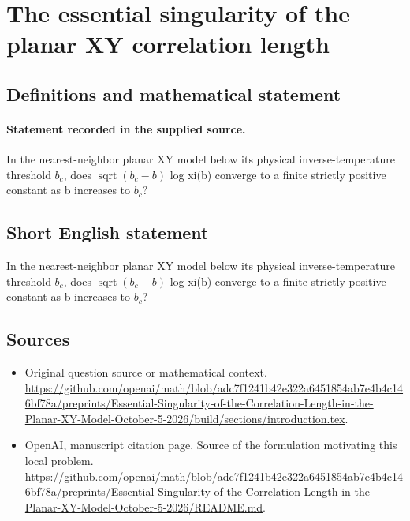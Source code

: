 \documentclass[11pt]{article}
\begin{document}
\section*{The essential singularity of the planar XY correlation length}\label{30007415}
\subsection{Definitions and mathematical statement}
\paragraph{Statement recorded in the supplied source.}
In the nearest-neighbor planar XY model below its physical inverse-temperature threshold $b_c$, does $\operatorname{sqrt}(b_c-b)$ log xi(b) converge to a finite strictly positive constant as b increases to $b_c$?
\subsection{Short English statement}
In the nearest-neighbor planar XY model below its physical inverse-temperature threshold $b_c$, does $\operatorname{sqrt}(b_c-b)$ log xi(b) converge to a finite strictly positive constant as b increases to $b_c$?
\subsection{Sources}
\begin{itemize}
\item[S1] Original question source or mathematical context.
\url{https://github.com/openai/math/blob/adc7f1241b42e322a6451854ab7e4b4c146bf78a/preprints/Essential-Singularity-of-the-Correlation-Length-in-the-Planar-XY-Model-October-5-2026/build/sections/introduction.tex}.
\item[S2] OpenAI, manuscript citation page. Source of the formulation motivating this local problem.
\url{https://github.com/openai/math/blob/adc7f1241b42e322a6451854ab7e4b4c146bf78a/preprints/Essential-Singularity-of-the-Correlation-Length-in-the-Planar-XY-Model-October-5-2026/README.md}.
\end{itemize}
\end{document}

